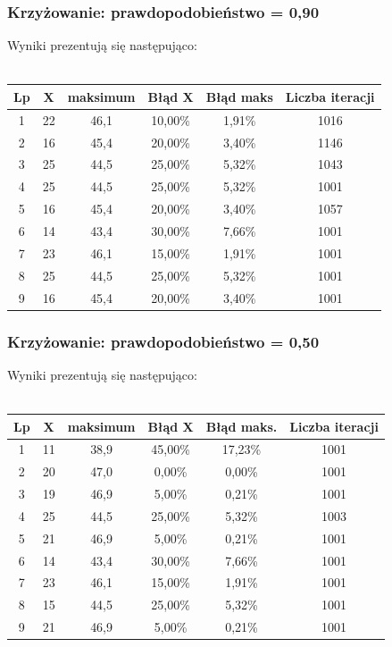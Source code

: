 \documentclass[a4paper,11pt]{article}
\begin{document}
				\subsubsection{Krzyżowanie: prawdopodobieństwo = 0,90}
					Wyniki prezentują się następująco:\\~\\
					\begin{tabular}{|c|c|c|c|c|c|}
						\hline 
						Lp & X & maksimum & Błąd X & Błąd maks &Liczba iteracji\\
						\hline
						1 & 22 & 46,1 & 10,00\% &1,91\% & 1016 \\\hline
						2 & 16 & 45,4 & 20,00\% &3,40\% & 1146  \\\hline
						3 & 25 & 44,5 & 25,00\% &5,32\% &1043 \\\hline
						4 & 25 & 44,5 & 25,00\% &5,32\% &1001 \\\hline
						5 & 16 & 45,4 & 20,00\% &3,40\% &1057 \\\hline
						6 & 14 & 43,4 & 30,00\% &7,66\% &1001 \\\hline
						7 & 23 & 46,1 & 15,00\% &1,91\% &1001 \\\hline
						8 & 25 & 44,5 & 25,00\% &5,32\% &1001 \\\hline
						9 & 16 & 45,4 & 20,00\% &3,40\%&1001 \\\hline
					\end{tabular}
				\subsubsection{Krzyżowanie: prawdopodobieństwo = 0,50}
					Wyniki prezentują się następująco:\\~\\
					\begin{tabular}{|c|c|c|c|c|c|}
						\hline 
						Lp & X & maksimum & Błąd X & Błąd maks. & Liczba iteracji\\
						\hline
						1 & 11 & 38,9 & 45,00\% &17,23\% &1001 \\\hline
						2 & 20 & 47,0 & 0,00\% &0,00\% &1001  \\\hline
						3 & 19 & 46,9 & 5,00\% & 0,21\%&1001 \\\hline
						4 & 25 & 44,5 & 25,00\% &5,32\% &1003 \\\hline
						5 & 21 & 46,9 & 5,00\% & 0,21\%&1001 \\\hline
						6 & 14 & 43,4 & 30,00\% & 7,66\%&1001 \\\hline
						7 & 23 & 46,1 & 15,00\% & 1,91\%&1001 \\\hline
						8 & 15 & 44,5 & 25,00\% & 5,32\%&1001 \\\hline
						9 & 21 & 46,9 & 5,00\% &0,21\% &1001 \\\hline
					\end{tabular} 
\end{document}
